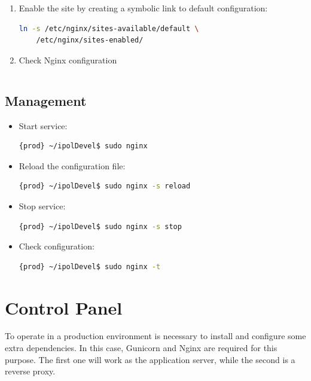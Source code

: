 \documentclass[a4paper,12pt]{article}
\begin{document}
\begin{enumerate}
    \item Enable the site by creating a symbolic link to default configuration:
    \begin{lstlisting}[language=Bash]
    ln -s /etc/nginx/sites-available/default \
    /etc/nginx/sites-enabled/
    \end{lstlisting}

    \item Check Nginx configuration
    \begin{lstlisting}[language=Bash]

    \end{lstlisting}
\end{enumerate}

\subsection{Management}

\begin{itemize}
    \item Start service:
    \begin{lstlisting}[language=Bash]
    {prod} ~/ipolDevel$ sudo nginx
    \end{lstlisting}
    \item Reload the configuration file:
    \begin{lstlisting}[language=Bash]
    {prod} ~/ipolDevel$ sudo nginx -s reload
    \end{lstlisting}
    \item Stop service:
    \begin{lstlisting}[language=Bash]
    {prod} ~/ipolDevel$ sudo nginx -s stop
    \end{lstlisting}
    \item Check configuration:
    \begin{lstlisting}[language=Bash]
    {prod} ~/ipolDevel$ sudo nginx -t
    \end{lstlisting}
\end{itemize}


\section{Control Panel}
To operate in a production environment is necessary to install and configure some extra dependencies. In this case, Gunicorn and Nginx are
required for this purpose. The first one will work as the application server, while the second is a reverse proxy.
\end{document}
